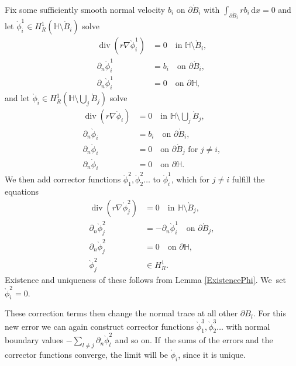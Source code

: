 \documentclass[JEP,XML,SOM,Unicode,published]{cedram}
\let\backslash\setminus
\let\ts\textstyle
\theoremstyle{definition}
\renewcommand{\div}{\operatorname{div}}
\newcommand\eq{=}
\newcommand\dd{\,\mathrm{d}}
\newcommand\dx{\dd x}
\let\de\partial
\begin{document}
Fix some sufficiently smooth normal velocity $b_i$ on $\de \grave{B}_i$ with $\int_{\de \grave{B}_i} rb_i\dx=0$ and let $\grave{\phi}_i^1\in H_R^1(\mathbb{H}\backslash \grave{B}_i)$ solve
\begin{align*}
\div(r\nabla\grave{\phi}_i^1)&\eq 0\quad\text{in $\mathbb{H}\backslash \grave{B}_i$},\\
\de_n \grave{\phi}_i^1&\eq b_i\quad\text{on $\de \grave{B}_i$},\\
\de_n\grave{\phi}_i^1&\eq0 \quad\text{on $\de\mathbb{H}$},
\end{align*}
and let $\grave{\phi}_i\in H_R^1(\mathbb{H}\backslash\bigcup_j\grave{B}_j)$ solve
\begin{align*}
\div(r\nabla\grave{\phi}_i)&\eq 0\quad\text{in $\mathbb{H}\backslash \ts\bigcup_j \grave{B}_j$},\\
\de_n \grave{\phi}_i&\eq b_i\quad\text{on $\de \grave{B}_i$},\\
\de_n \grave{\phi}_i&\eq0 \quad\text{on $\de \grave{B}_j$ for $j\neq i$},\\
\de_n \grave{\phi}_i&\eq0 \quad\text{on $\de\mathbb{H}$}.
\end{align*}
We then add corrector functions $\grave{\phi}_{1}^2,\grave{\phi}_{2}^2\dots$ to $\grave{\phi}_i^1$, which for $j\neq i$ fulfill the equations
\begin{align*}
\div(r\nabla\grave{\phi}_{j}^2)&\eq0 \quad\text{in $\mathbb{H}\backslash \grave{B}_j$},\\
\de_n \grave{\phi}_{j}^2&\eq-\de_n \grave{\phi}_i^1 \quad\text{on $\de \grave{B}_j$},\\
\de_n\grave{\phi}_j^2&\eq0 \quad\text{on $\de\mathbb{H}$},\\
 \grave{\phi}_j^2&\in H_R^1.
\end{align*}
Existence and uniqueness of these follows from Lemma \ref{ExistencePhi}. We~set $\grave{\phi}_i^2=0$.

These correction terms then change the normal trace at all other $\de B_l$. For this new error we can again construct corrector functions $\grave{\phi}_{1}^3,\grave{\phi}_{2}^3\dots$ with normal boundary values $-\sum_{l\neq j} \de_n \grave{\phi}_l^2$ and so on. If~the sums of the errors and the corrector functions converge, the limit will be $\grave{\phi}_i$, since it is unique.
\end{document}
